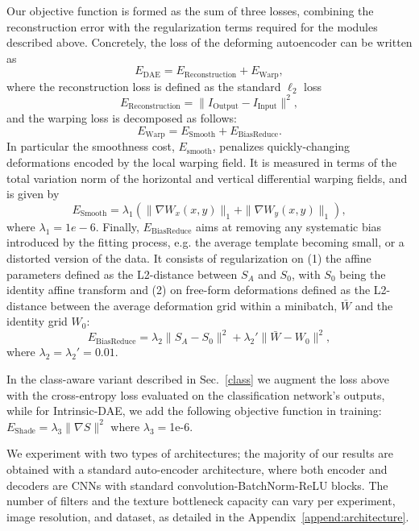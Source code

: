 \documentclass[runningheads]{llncs}
\begin{document}
Our objective function is formed as the sum of three losses, combining the reconstruction error with the regularization terms required for the modules described above. Concretely, the loss of the deforming autoencoder can be written as
\begin{equation}
E_{\text{DAE}} = E_{\text{Reconstruction}} + E_{\text{Warp}},
\end{equation}
where the reconstruction loss is defined as the standard $\ell_2$ loss
\begin{equation}
E_{\text{Reconstruction}} = \|I_{\text{Output}} - I_{\text{Input}}\|^2,
\end{equation}
and the warping loss is decomposed as follows:
\begin{equation}
E_{\text{Warp}} = E_{\text{Smooth}} + E_{\text{BiasReduce}}.
\end{equation}
In particular the smoothness cost, $E_{\text{smooth}}$, penalizes quickly-changing deformations encoded by the local warping field. It is measured in terms of the total variation 
norm of the horizontal and vertical differential warping fields, and is given by
\begin{equation}
E_\text{Smooth} =  \lambda_1 \left(\| \nabla W_{x}(x,y)\|_1 + \| \nabla W_{y}(x,y)\|_1\right),
\end{equation}
where $\lambda_1=1e-6$.
Finally, $E_{\text{BiasReduce}}$ aims at removing any systematic bias introduced by the fitting process, e.g. the average template becoming small, or a distorted version of the data. It consists of regularization
on (1) the affine parameters defined as the L2-distance between $S_A$ and $S_0$,  with
$S_0$ being the identity affine transform and (2) on free-form deformations defined as the L2-distance between the average deformation grid within a minibatch, $\bar{W}$ and the identity grid $W_0$:
\begin{equation}
E_{\text{BiasReduce}} = \lambda_2 \|S_A - S_0\|^2 + \lambda_2' \|\bar{W} - W_0\|^2,
\end{equation}
where $\lambda_2=\lambda_2'=0.01$. 



In the class-aware variant described in Sec.~\ref{class} we augment the loss above with the cross-entropy loss evaluated on the classification network's outputs, while for Intrinsic-DAE, we add the following objective function in training:\\
\noindent $ E_{\text{Shade}} = \lambda_3 \|\nabla S\|^2$ where $\lambda_3 = $1e-6.

We experiment with two types of architectures; the majority of our results are obtained with a standard auto-encoder architecture, 
where both encoder and decoders are CNNs with standard convolution-BatchNorm-ReLU blocks. The number of filters and the texture bottleneck capacity can vary per experiment, image resolution, and dataset, as  detailed in the Appendix~\ref{append:architecture}. 
\end{document}
